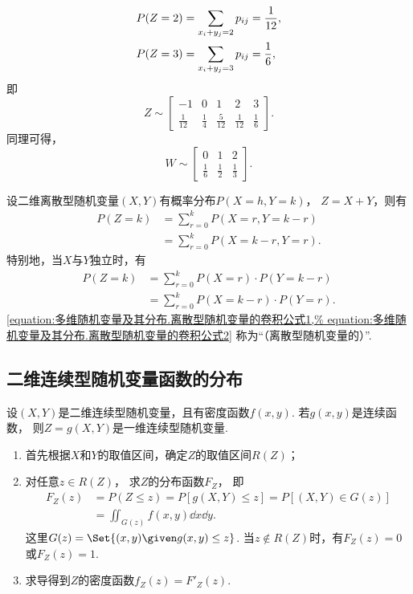 \begin{example}
\begin{solution}
\begin{align*}
	&P(Z=2) = \sp{2} = \frac{1}{12}, \\
	&P(Z=3) = \sp{3} = \frac{1}{6},
\end{align*}
即\[
	Z \sim \begin{bmatrix}
		-1 & 0 & 1 & 2 & 3 \\
		\frac{1}{12} & \frac{1}{4} & \frac{5}{12} & \frac{1}{12} & \frac{1}{6}
	\end{bmatrix}.
\]
同理可得，\[
	W \sim \begin{bmatrix}
		0 & 1 & 2 \\
		\frac{1}{6} & \frac{1}{2} & \frac{1}{3}
	\end{bmatrix}.
\]
\end{solution}
\end{example}

\begin{theorem}\label{theorem:多维随机变量及其分布.离散型随机变量的卷积公式}
设二维离散型随机变量\((X,Y)\)有概率分布\(P(X=h,Y=k)\)，
\(Z=X+Y\)，则有\begin{align}
	P(Z=k)
	&= \sum_{r=0}^k P(X=r,Y=k-r) \\
	&= \sum_{r=0}^k P(X=k-r,Y=r).
\end{align}
特别地，当\(X\)与\(Y\)独立时，有\begin{align}
	P(Z=k)
	&= \sum_{r=0}^k P(X=r) \cdot P(Y=k-r) \label{equation:多维随机变量及其分布.离散型随机变量的卷积公式1} \\
	&= \sum_{r=0}^k P(X=k-r) \cdot P(Y=r). \label{equation:多维随机变量及其分布.离散型随机变量的卷积公式2}
\end{align}
\rm\cref{equation:多维随机变量及其分布.离散型随机变量的卷积公式1,%
equation:多维随机变量及其分布.离散型随机变量的卷积公式2}
称为“（离散型随机变量的）”.
\end{theorem}

\subsection{二维连续型随机变量函数的分布}
设\((X,Y)\)是二维连续型随机变量，且有密度函数\(f(x,y)\).
若\(g(x,y)\)是连续函数，
则\(Z = g(X,Y)\)是一维连续型随机变量.
\begin{enumerate}
	\item 首先根据\(X\)和\(Y\)的取值区间，确定\(Z\)的取值区间\(R(Z)\)；

	\item 对任意\(z \in R(Z)\)，
	求\(Z\)的分布函数\(F_Z\)，
	即\begin{align*}
		F_Z(z) &= P(Z \leq z)
		= P[g(X,Y) \leq z]
		= P[(X,Y) \in G(z)] \\
		&= \iint_{G(z)} f(x,y) \dd{x}\dd{y}.
	\end{align*}
	这里\(G(z) = \Set{ (x,y) \given g(x,y) \leq z }\).
	当\(z \notin R(Z)\)时，有\(F_Z(z)=0\)或\(F_Z(z)=1\).

	\item 求导得到\(Z\)的密度函数\(f_Z(z) = F'_Z(z)\).
\end{enumerate}

